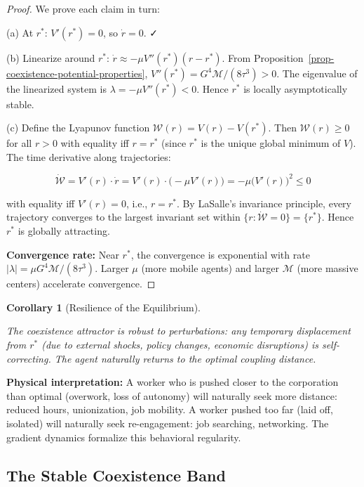 \documentclass[11pt]{article}
\theoremstyle{plain}
\newtheorem{corollary}[theorem]{Corollary}
\theoremstyle{definition}
\theoremstyle{remark}
\let\origsubsection\subsection
\renewcommand{\subsection}{\needspace{7\baselineskip}\origsubsection}
\begin{document}
\begin{proof}
We prove each claim in turn:

(a) At $r^*$: $V'(r^*) = 0$, so $\dot{r} = 0$. ✓

(b) Linearize around $r^*$: $\dot{r} \approx -\mu V''(r^*)(r - r^*)$. From Proposition~\ref{prop-coexistence-potential-properties}, $V''(r^*) = G^4\mathcal{M}/(8\tau^3) > 0$. The eigenvalue of the linearized system is $\lambda = -\mu V''(r^*) < 0$. Hence $r^*$ is locally asymptotically stable.

(c) Define the Lyapunov function $\mathcal{W}(r) = V(r) - V(r^*)$. Then $\mathcal{W}(r) \geq 0$ for all $r > 0$ with equality iff $r = r^*$ (since $r^*$ is the unique global minimum of $V$). The time derivative along trajectories:

$$\dot{\mathcal{W}} = V'(r) \cdot \dot{r} = V'(r) \cdot \bigl(-\mu V'(r)\bigr) = -\mu \bigl(V'(r)\bigr)^2 \leq 0$$

with equality iff $V'(r) = 0$, i.e., $r = r^*$. By LaSalle's invariance principle, every trajectory converges to the largest invariant set within $\{r : \dot{\mathcal{W}} = 0\} = \{r^*\}$. Hence $r^*$ is globally attracting.

\textbf{Convergence rate:} Near $r^*$, the convergence is exponential with rate $|\lambda| = \mu G^4\mathcal{M}/(8\tau^3)$. Larger $\mu$ (more mobile agents) and larger $\mathcal{M}$ (more massive centers) accelerate convergence.
\end{proof}

\begin{corollary}[Resilience of the Equilibrium]
\label{cor-resilience-equilibrium}

The coexistence attractor is robust to perturbations: any temporary displacement from $r^*$ (due to external shocks, policy changes, economic disruptions) is self-correcting. The agent naturally returns to the optimal coupling distance.
\end{corollary}

\textbf{Physical interpretation:} A worker who is pushed closer to the
corporation than optimal (overwork, loss of autonomy) will naturally
seek more distance: reduced hours, unionization, job mobility. A worker
pushed too far (laid off, isolated) will naturally seek re-engagement:
job searching, networking. The gradient dynamics formalize this
behavioral regularity.

\subsection{The Stable Coexistence
Band}\label{the-stable-coexistence-band}
\end{document}
